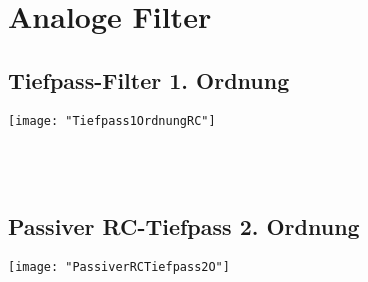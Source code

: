\section{Analoge Filter}
\subsection{Tiefpass-Filter 1. Ordnung}
\begin{minipage}[t]{0.3\textwidth}
	\vspace{0pt}
	\texttt{[image: "Tiefpass1OrdnungRC"]}
\end{minipage}\hspace{0.05\textwidth}
\begin{minipage}[t]{0.3\textwidth}
	\vspace{0pt}
	\\
	\\
\end{minipage}
\begin{minipage}[t]{0.3\textwidth}
	\vspace{0pt}
	
\end{minipage}
\vspace{2mm}



\subsection{Passiver RC-Tiefpass 2. Ordnung}
\begin{minipage}[t]{0.3\textwidth}
	\vspace{0pt}								%
	\texttt{[image: "PassiverRCTiefpass2O"]}
\end{minipage}\hspace{0.05\textwidth}
\begin{minipage}[t]{0.3\textwidth}
	\vspace{0pt}
	\\
	\\
\end{minipage}
\begin{minipage}[t]{0.3\textwidth}
	\vspace{0pt}
	
\end{minipage}
\vspace{2mm}

